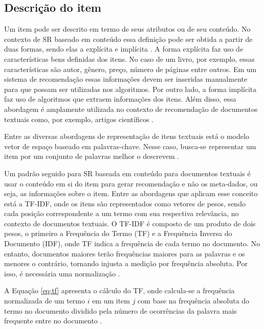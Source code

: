     \subsection{Descrição do item}
   
    Um item pode ser descrito em termo de seus atributos ou de seu conteúdo. No contexto de SR baseado em conteúdo essa definição pode ser obtida a partir de duas formas, sendo elas a explícita e implícita \cite{Jannach2010}. A forma explícita faz uso de características bens definidas dos itens. No caso de um livro, por exemplo, essas características são autor, gênero, preço, número de páginas entre outros. Em um sistema de recomendação essas informações devem ser inseridas manualmente para que possam ser utilizadas nos algoritmos. Por outro lado, a forma implícita faz uso de algoritmos que extraem informações dos itens. Além disso, essa abordagem é amplamente utilizada no contexto de recomendação de documentos textuais como, por exemplo, artigos científicos \cite{Garcia2013}.
    
    
    Entre as diversas abordagens de representação de itens textuais está o modelo vetor de espaço baseado em palavras-chave. Nesse caso, busca-se representar um item por um conjunto de palavras melhor o descrevem \cite{Jannach2010}.
    
    Um padrão seguido para SR baseada em conteúdo para documentos textuais é usar o conteúdo em si do item para gerar recomendação e não os meta-dados, ou seja, as informações sobre o item. Entre as abordagens que aplicam esse conceito está a TF-IDF, onde os itens são representados como vetores de pesos, sendo cada posição correspondente a um termo com sua respectiva relevância, no contexto de documentos textuais. 
    O TF-IDF é composto de um produto de dois pesos, o primeiro a Frequência do Termo (TF) e a Frequência Inversa do Documento (IDF), onde TF indica a frequência de cada termo no documento. No entanto, documentos maiores terão frequências maiores para as palavras e os menores o contrário, tornando injusta a medição por frequência absoluta. Por isso, é necessária uma normalização \cite{Jannach2010}. 
    
    A Equação \ref{eq:tf} apresenta o cálculo do TF, onde calcula-se a frequência normalizada de um termo $i$ em um item $j$ com base na frequência absoluta do termo no documento dividido pela número de ocorrências da palavra mais frequente entre no documento \cite{Jannach2010}.
     
